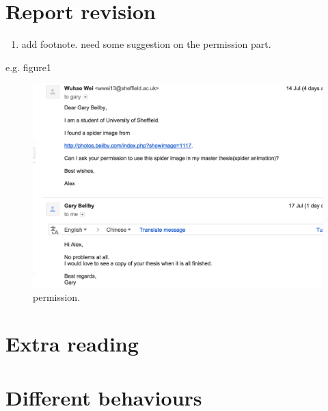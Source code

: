 \documentclass[11pt]{article}
\begin{document}
\section{Report revision}
\label{sec-2}
\begin{enumerate}
\item add footnote. need some suggestion on the permission part.
\end{enumerate}
e.g. figure1
\begin{figure}[htb]
\centering
\includegraphics[width=.9\linewidth]{./img/permission_sample.png}
\caption{\label{mylabel}permission.}
\end{figure}


\section{Extra reading}
\label{sec-3}

\section{Different behaviours}
\label{sec-4}
\end{document}
